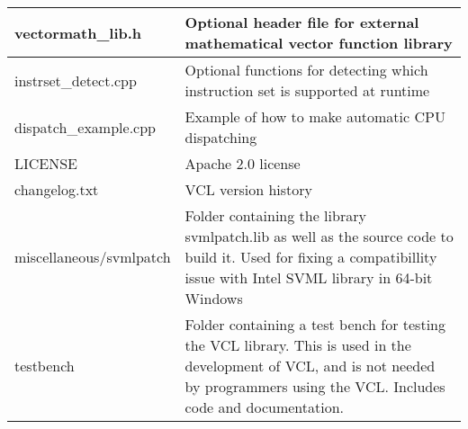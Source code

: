 \documentclass[vcl_manual.tex]{subfiles}
\begin{document}
\begin{longtable}[l]{|p{40mm}|p{100mm}|}
vectormath\_lib.h & Optional header file for external mathematical vector function library \\ \hline

instrset\_detect.cpp & Optional functions for detecting which instruction set is supported at runtime \\ \hline

dispatch\_example.cpp & Example of how to make automatic CPU dispatching \\ \hline

LICENSE & Apache 2.0 license \\ \hline

changelog.txt & VCL version history \\ \hline

miscellaneous/svmlpatch & Folder containing the library svmlpatch.lib as well as the source code to build it. Used for fixing a compatibillity issue with Intel SVML library in 64-bit Windows \\ \hline

testbench & Folder containing a test bench for testing the VCL library. This is used in the development of VCL, and is not needed by programmers using the VCL. Includes code and documentation. \\ \hline

\end{longtable}
\end{document}
